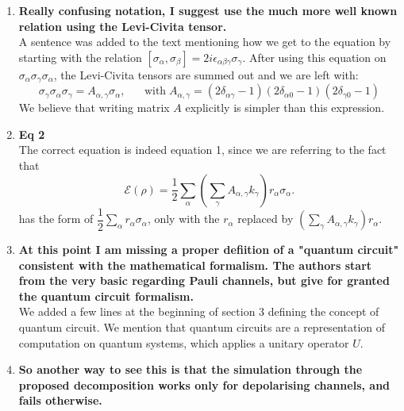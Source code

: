 \documentclass[10pt,letterpaper]{article} %
\begin{document}
\begin{enumerate}
\item \textbf{ Really confusing notation, I suggest use the much more well known relation using the Levi-Civita tensor.}\\


A sentence was added to the text mentioning how we get to the equation by starting with the relation $[\sigma_\alpha,\sigma_\beta] = 2 i
\epsilon_{\alpha \beta \gamma} \sigma_\gamma$.
After using this equation on $\sigma_{\alpha} \sigma_{\gamma} \sigma_{\alpha}$, the Levi-Civita tensors are summed out and we are left with:
\begin{equation*}
\sigma_{\gamma} \sigma_{\alpha} \sigma_{\gamma}  =   A_{\alpha,\gamma} \sigma_{\alpha}, \;\;\;\;\;\; \text{with} \; A_{\alpha, \gamma} = (2\delta_{\alpha \gamma}-1)(2\delta_{\alpha 0}-1)(2\delta_{\gamma 0}-1)
\end{equation*}
We believe that writing matrix $A$ explicitly is simpler than this expression. 

\item \textbf{Eq 2} \\

The correct equation is indeed equation 1, since we are referring to the fact that 
\begin{equation}
\label{eq: rho-transformada}
\mathcal{E}(\rho) = \dfrac{1}{2} \sum_{\alpha} \left(\sum_{\gamma} A_{\alpha, \gamma} k_{\gamma} \right) r_{\alpha} \sigma_{\alpha}.
\end{equation}
has the form of $\dfrac{1}{2} \sum_{\alpha} r_{\alpha} \sigma_{\alpha}$, only with the
$r_{\alpha}$ replaced by $\left( \sum_{\gamma} A_{\alpha,\gamma} k_{\gamma} \right) r_{\alpha}$.


\item \textbf{At this point I am missing a proper defiition of a "quantum circuit" consistent with the mathematical formalism. The authors start from the very basic regarding Pauli channels, but give for granted the quantum circuit formalism.} \\

We added a few lines at the beginning of section 3 defining the concept of quantum circuit.
We  mention that quantum circuits are a representation of computation on quantum systems, which applies a unitary operator $U$. 

\item  \textbf{So another way to see this is that the simulation through the proposed decomposition works only for depolarising channels, and fails otherwise.}\\


\end{enumerate}
\end{document}

